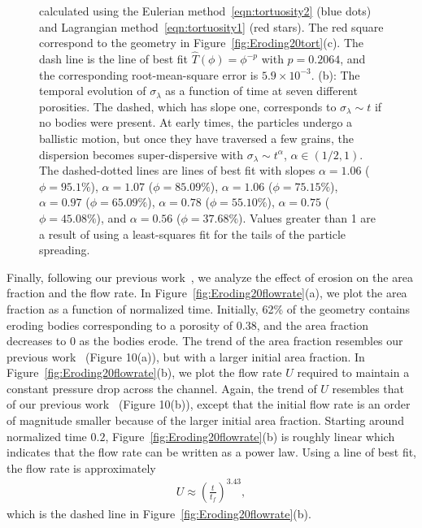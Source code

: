 \documentclass[preprint, 10pt]{elsarticle}
\begin{document}
\begin{figure}[H]
{calculated using the Eulerian method~\eqref{eqn:tortuosity2} (blue dots)
and Lagrangian method~\eqref{eqn:tortuosity1} (red stars).  The red
square correspond to the geometry in Figure~\ref{fig:Eroding20tort}(c).
The dash line is the line of best fit $\widehat{T}(\phi)=\phi^{-p}$ with
$p=0.2064$, and the corresponding root-mean-square error is $5.9 \times
10^{-3}$. (b): The temporal evolution of $\sigma_\lambda$ as a function
of time at seven different porosities.  The dashed, which has slope one,
corresponds to $\sigma_\lambda \sim t$ if no bodies were present.  At
early times, the particles undergo a ballistic motion, but once they
have traversed a few grains, the dispersion becomes super-dispersive
with $\sigma_\lambda \sim t^\alpha$, $\alpha \in (1/2,1)$.  The
dashed-dotted lines are lines of best fit with slopes $\alpha = 1.06$
($\phi=95.1\%$), $\alpha = 1.07$ ($\phi=85.09\%$), $\alpha = 1.06$
($\phi=75.15\%$), $\alpha = 0.97$ ($\phi=65.09\%$), $\alpha = 0.78$
($\phi=55.10\%$), $\alpha = 0.75$ ($\phi=45.08\%$), and $\alpha = 0.56$
($\phi=37.68\%$).  Values greater than 1 are a result of using a
least-squares fit for the tails of the particle spreading.}
\end{figure}

Finally, following our previous work~\cite{qua-moo2018}, we analyze the
effect of erosion on the area fraction and the flow rate.  In
Figure~\ref{fig:Eroding20flowrate}(a), we plot the area fraction as a
function of normalized time.  Initially, 62\% of the geometry contains
eroding bodies corresponding to a porosity of $0.38$, and the area
fraction decreases to 0 as the bodies erode.  The trend of the area
fraction resembles our previous work~\cite{qua-moo2018} (Figure 10(a)),
but with a larger initial area fraction.  In
Figure~\ref{fig:Eroding20flowrate}(b), we plot the flow rate $U$
required to maintain a constant pressure drop across the channel.
Again, the trend of $U$ resembles that of our previous
work~\cite{qua-moo2018} (Figure 10(b)), except that the initial flow
rate is an order of magnitude smaller because of the larger initial area
fraction.  Starting around normalized time $0.2$,
Figure~\ref{fig:Eroding20flowrate}(b) is roughly linear which indicates
that the flow rate can be written as a power law.  Using a line of best
fit, the flow rate is approximately 
\begin{align} 
  U \approx \left(\frac{t}{t_f}\right)^{3.43},
\end{align}
which is the dashed line in Figure~\ref{fig:Eroding20flowrate}(b).
\end{document}
